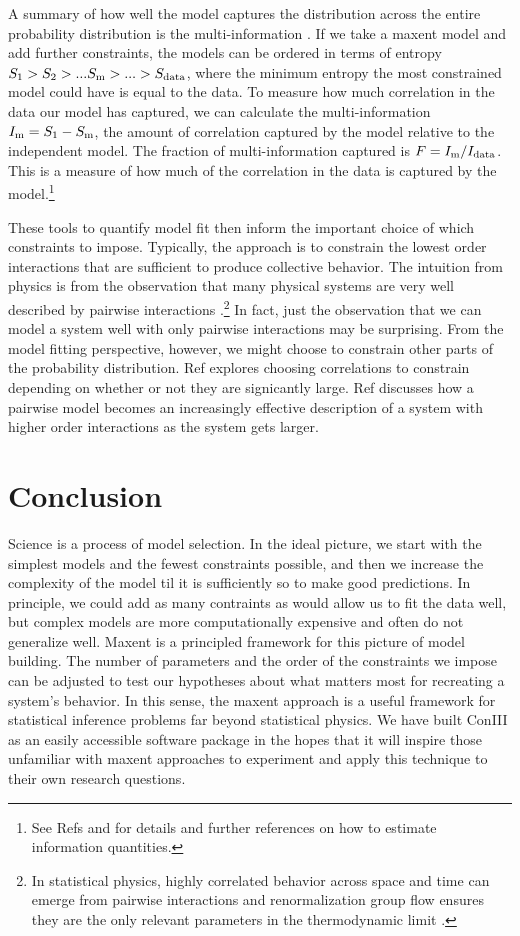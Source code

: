 \documentclass[aps,prl,twocolumn,nofootinbib]{revtex4-1}
\begin{document}
A summary of how well the model captures the distribution across the entire probability distribution is the multi-information \cite{Nemenman:2004wz,Schneidman:2006he}. If we take a maxent model and add further constraints, the models can be ordered in terms of entropy $S_{\rm 1}>S_{2}>...S_{\rm m}>...>S_{\rm data}$, where the minimum entropy the most constrained model could have is equal to the data. To measure how much correlation in the data our model has captured, we can calculate the multi-information $I_{\rm m} = S_{\rm 1}-S_{\rm m}$, the amount of correlation captured by the model relative to the independent model. The fraction of multi-information captured is $F=I_{\rm m}/I_{\rm data}$. This is a measure of how much of the correlation in the data is captured by the model.\footnote{See Refs \cite{Bialek:2012ueb} and \cite{Lee:2015ev} for details and further references on how to estimate information quantities.}

These tools to quantify model fit then inform the important choice of which constraints to impose. Typically, the approach is to constrain the lowest order interactions that are sufficient to produce collective behavior. The intuition from physics is from the observation that many physical systems are very well described by pairwise interactions \cite{Ranganathan:2007wz}.\footnote{In statistical physics, highly correlated behavior across space and time can emerge from pairwise interactions and renormalization group flow ensures they are the only relevant parameters in the thermodynamic limit \cite{}.} In fact, just the observation that we can model a system well with only pairwise interactions may be surprising. From the model fitting perspective, however, we might choose to constrain other parts of the probability distribution. Ref \cite{Ganmor:2011ct} explores choosing correlations to constrain depending on whether or not they are signicantly large. Ref \cite{Nemenman:2016kl} discusses how a pairwise model becomes an increasingly effective description of a system with higher order interactions as the system gets larger.



\section{Conclusion}
Science is a process of model selection. In the ideal picture, we start with the simplest models and the fewest constraints possible, and then we increase the complexity of the model til it is sufficiently so to make good predictions. In principle, we could add as many contraints as would allow us to fit the data well, but complex models are more computationally expensive and often do not generalize well.
Maxent is a principled framework for this picture of model building. The number of parameters and the order of the constraints we impose can be adjusted to test our hypotheses about what matters most for recreating a system's behavior.
In this sense, the maxent approach is a useful framework for statistical inference problems far beyond statistical physics.  We have built ConIII as an easily accessible software package in the hopes that it will inspire those unfamiliar with maxent approaches to experiment and apply this technique to their own research questions.
\end{document}
